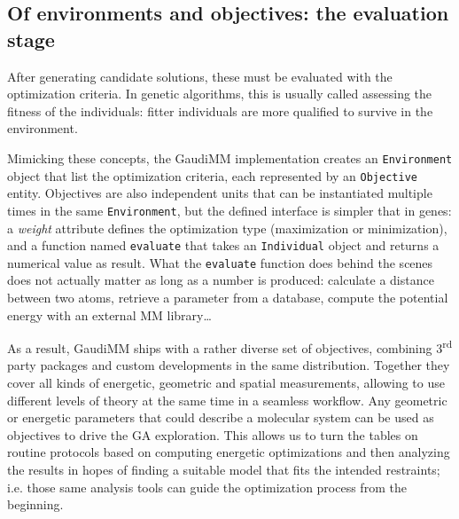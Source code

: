 


\subsection{Of environments and objectives: the evaluation stage}
After generating candidate solutions, these must be evaluated with the optimization criteria. In genetic algorithms, this is usually called assessing the fitness of the individuals: fitter individuals are more qualified to survive in the environment.

Mimicking these concepts, the GaudiMM implementation creates an \texttt{Environment} object that list the optimization criteria, each represented by an \texttt{Objective} entity. Objectives are also independent units that can be instantiated multiple times in the same \texttt{Environment}, but the defined interface is simpler that in genes: a \textit{weight} attribute defines the optimization type (maximization or minimization), and a function named \texttt{evaluate} that takes an \texttt{Individual} object and returns a numerical value as result. What the \texttt{evaluate} function does behind the scenes does not actually matter as long as a number is produced: calculate a distance between two atoms, retrieve a parameter from a database, compute the potential energy with an external MM library\ldots

As a result, GaudiMM ships with a rather diverse set of objectives, combining 3\textsuperscript{rd} party packages and custom developments in the same distribution. Together they cover all kinds of energetic, geometric and spatial measurements, allowing to use different levels of theory at the same time in a seamless workflow. Any geometric or energetic parameters that could describe a molecular system can be used as objectives to drive the GA exploration. This allows us to turn the tables on routine protocols based on computing energetic optimizations and then analyzing the results in hopes of finding a suitable model that fits the intended restraints; i.e. those same analysis tools can guide the optimization process from the beginning.

